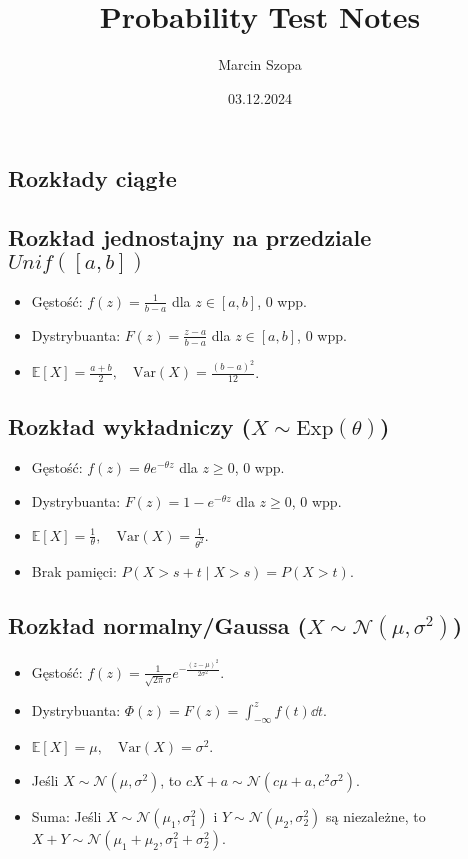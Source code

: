 \documentclass{article}
\title{Probability Test Notes}
\author{Marcin Szopa}
\date{03.12.2024}
\theoremstyle{definition}
\theoremstyle{remark}
\begin{document}
\begin{multicols}{2}
    \section*{Rozkłady ciągłe}

    \subsection*{Rozkład jednostajny na przedziale \(Unif([a, b]) \)}
    \begin{itemize}[itemsep=0pt, left=0pt]
        \item Gęstość: \( f(z) = \frac{1}{b-a} \) dla \( z \in [a, b] \), 0 wpp.
        \item Dystrybuanta: \( F(z) = \frac{z-a}{b-a} \) dla \( z \in [a, b] \), 0 wpp.
        \item \(\mathbb{E}[X] = \frac{a+b}{2}, \quad \text{Var}(X) = \frac{(b-a)^2}{12}\).
    \end{itemize}

    \subsection*{Rozkład wykładniczy (\( X \sim \text{Exp}(\theta) \))}
    \begin{itemize}[itemsep=0pt, left=0pt]
        \item Gęstość: \( f(z) = \theta e^{-\theta z} \) dla \( z \geq 0 \), 0 wpp.
        \item Dystrybuanta: \( F(z) = 1 - e^{-\theta z} \) dla \( z \geq 0 \), 0 wpp.
        \item \(\mathbb{E}[X] = \frac{1}{\theta}, \quad \text{Var}(X) = \frac{1}{\theta^2}\).
        \item Brak pamięci: \( P(X > s+t \mid X > s) = P(X > t) \).   
    \end{itemize}

    \subsection*{Rozkład normalny/Gaussa (\( X \sim \mathcal{N}(\mu, \sigma^2) \))}

    \begin{itemize}[itemsep=0pt, left=0pt]
        \item Gęstość: \( f(z) = \frac{1}{\sqrt{2\pi}\sigma} e^{-\frac{(z-\mu)^2}{2\sigma^2}} \).
        \item Dystrybuanta: \(\Phi(z)=F(z) = \int_{-\infty}^{z} f(t) \dd{t}\).
        \item \(\mathbb{E}[X] = \mu, \quad \text{Var}(X) = \sigma^2\).
        \item Jeśli \(X \sim \mathcal{N}(\mu, \sigma^2)\), to \(cX+a \sim \mathcal{N}(c\mu+a, c^2\sigma^2)\).
        \item Suma: Jeśli \( X \sim \mathcal{N}(\mu_1, \sigma_1^2) \) i \( Y \sim \mathcal{N}(\mu_2, \sigma_2^2) \) są niezależne, to \( X+Y \sim \mathcal{N}(\mu_1+\mu_2, \sigma_1^2+\sigma_2^2) \).


\end{itemize}
\end{multicols}
\end{document}
